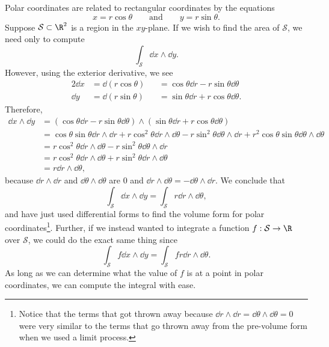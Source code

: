 Polar coordinates are related to rectangular coordinates by the equations
\[
	x=r\cos\theta \qquad\text{and}\qquad y=r\sin\theta.
\]
Suppose $\mathcal S\subset \R^2$ is a region in the $xy$-plane.  If we wish to find
the area of $\mathcal S$, we need only to compute
\[
	\int_{\mathcal S} \dd x\wedge \dd y.
\]
However, using the exterior derivative, we see
\begin{alignat*}{2}
	\dd x &= \dd (r\cos\theta) &&= \cos\theta \dd r - r\sin\theta \dd \theta\\
	\dd y &= \dd (r\sin\theta) &&= \sin\theta \dd r + r\cos\theta \dd \theta.
\end{alignat*}
Therefore, 
\begin{align*}
	\dd x\wedge \dd y &= (\cos\theta \dd r - r\sin\theta \dd \theta)\wedge 
		(\sin\theta \dd r + r\cos\theta \dd \theta)\\
	&= \cos\theta\sin\theta \dd r\wedge \dd r + r\cos^2\theta \dd r\wedge \dd \theta
	-r\sin^2\theta \dd \theta \wedge \dd r + r^2\cos\theta\sin\theta \dd \theta\wedge \dd \theta\\
	&=r\cos^2\theta \dd r\wedge \dd \theta-r\sin^2\theta \dd \theta \wedge \dd r\\
	&= r\cos^2\theta \dd r\wedge \dd \theta + r\sin^2\theta \dd r \wedge \dd \theta\\
	&= r\dd r\wedge \dd \theta,
\end{align*}
because $\dd r\wedge \dd r$ and $\dd\theta\wedge \dd\theta$ are 0 and $\dd r\wedge 
\dd\theta = -\dd \theta \wedge \dd r$.  We conclude that
\[
	\int_{\mathcal S} \dd x\wedge \dd y = \int_{\mathcal S} r\dd r\wedge \dd \theta,
\]
and have just used differential forms to find the volume form for polar 
coordinates\footnote{
Notice that the terms that got thrown away because $\dd r\wedge \dd r=\dd\theta\wedge \dd\theta=0$
were very similar to the terms that go thrown away from the pre-volume form when
we used a limit process.
}.  Further, if we instead wanted to integrate a function $f:\mathcal S\to \R$
over $\mathcal S$, 
we could do the exact same thing since
\[
	\int_{\mathcal S} f\dd x\wedge \dd y = \int_{\mathcal S} fr\dd r\wedge \dd \theta.
\]
As long as we can determine what the value of $f$ is at a point in polar coordinates, 
we can compute the integral with ease.

